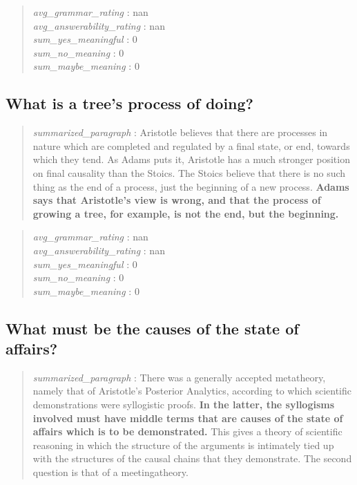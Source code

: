 \begin{quote}
\emph{avg\_grammar\_rating} : nan\\
\emph{avg\_answerability\_rating} : nan\\
\emph{sum\_yes\_meaningful} : 0\\
\emph{sum\_no\_meaning} : 0\\
\emph{sum\_maybe\_meaning} : 0
\end{quote}

\hypertarget{what-is-a-trees-process-of-doing}{%
\subsection{What is a tree's process of
doing?}\label{what-is-a-trees-process-of-doing}}

\begin{quote}
\emph{summarized\_paragraph} : Aristotle believes that there are
processes in nature which are completed and regulated by a final state,
or end, towards which they tend. As Adams puts it, Aristotle has a much
stronger position on final causality than the Stoics. The Stoics believe
that there is no such thing as the end of a process, just the beginning
of a new process. \textbf{Adams says that Aristotle's view is wrong, and
that the process of growing a tree, for example, is not the end, but the
beginning.}
\end{quote}

\begin{quote}
\emph{avg\_grammar\_rating} : nan\\
\emph{avg\_answerability\_rating} : nan\\
\emph{sum\_yes\_meaningful} : 0\\
\emph{sum\_no\_meaning} : 0\\
\emph{sum\_maybe\_meaning} : 0
\end{quote}

\hypertarget{what-must-be-the-causes-of-the-state-of-affairs}{%
\subsection{What must be the causes of the state of
affairs?}\label{what-must-be-the-causes-of-the-state-of-affairs}}

\begin{quote}
\emph{summarized\_paragraph} : There was a generally accepted
metatheory, namely that of Aristotle's Posterior Analytics, according to
which scientific demonstrations were syllogistic proofs. \textbf{In the
latter, the syllogisms involved must have middle terms that are causes
of the state of affairs which is to be demonstrated.} This gives a
theory of scientific reasoning in which the structure of the arguments
is intimately tied up with the structures of the causal chains that they
demonstrate. The second question is that of a meetingatheory.
\end{quote}


